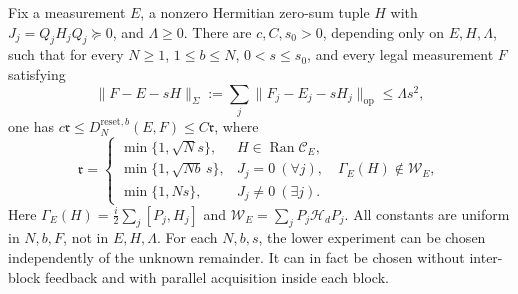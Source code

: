 \begin{theorem}\label{thm:resetwidth88}
Fix a measurement $E$, a nonzero Hermitian zero-sum tuple $H$ with
$J_j=Q_jH_jQ_j\succeq0$, and $\Lambda\ge0$.  There are
$c,C,s_0>0$, depending only on $E,H,\Lambda$, such that for every
$N\ge1$, $1\le b\le N$, $0<s\le s_0$, and every legal measurement
$F$ satisfying
\[
 \|F-E-sH\|_\Sigma:=\sum_j\|F_j-E_j-sH_j\|_{\mathrm{op}}
 \le\Lambda s^2,
\]
one has $c\mathfrak r\le D_N^{\mathrm{reset},b}(E,F)\le C\mathfrak r$,
where
\begin{equation}\label{eq:resetwidth88}
\mathfrak r=
\begin{cases}
 \min\{1,\sqrt N s\},&H\in\operatorname{Ran}\mathcal C_E,\\
 \min\{1,\sqrt{Nb}\,s\},&J_j=0\ (\forall j),\quad
                         \Gamma_E(H)\notin\mathcal W_E,\\
 \min\{1,Ns\},&J_j\ne0\ (\exists j).
\end{cases}
\end{equation}
Here $\Gamma_E(H)=\frac i2\sum_j[P_j,H_j]$ and
$\mathcal W_E=\sum_jP_j\mathcal H_dP_j$.
All constants are uniform in $N,b,F$, not in $E,H,\Lambda$.
For each $N,b,s$, the lower experiment can be chosen independently
of the unknown remainder.  It can in fact be chosen without
inter-block feedback and with parallel acquisition inside each block.
\end{theorem}
